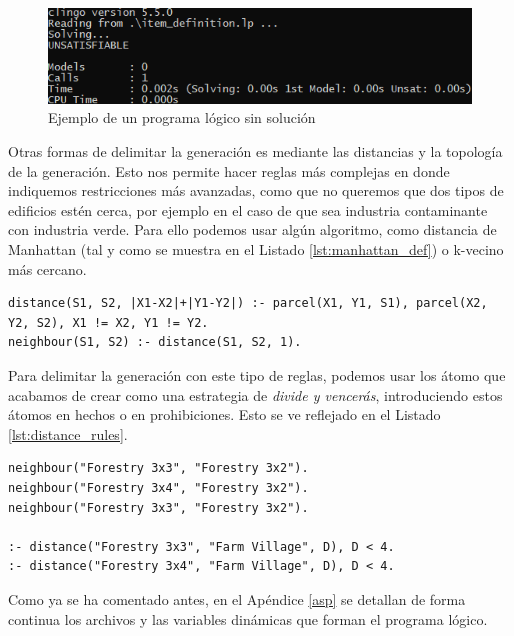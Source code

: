 \begin{figure}[!h]
	\centering
	\includegraphics[width=\textwidth]{images/clingo-unsat}
	\caption{Ejemplo de un programa lógico sin solución}
	\label{fig:clingo-unsat}
\end{figure}

Otras formas de delimitar la generación es mediante las distancias y la topología de la generación. Esto nos permite hacer reglas más complejas en donde indiquemos restricciones más avanzadas, como que no queremos que dos tipos de edificios estén cerca, por ejemplo en el caso de que sea industria contaminante con industria verde. Para ello podemos usar algún algoritmo, como distancia de Manhattan (tal y como se muestra en el Listado \ref{lst:manhattan_def}) o k-vecino más cercano. \\

\begin{lstlisting}[caption={Cálculo de la distancia del taxista en Aswer Set Programing},captionpos=b,label=lst:manhattan_def]
distance(S1, S2, |X1-X2|+|Y1-Y2|) :- parcel(X1, Y1, S1), parcel(X2, Y2, S2), X1 != X2, Y1 != Y2.
neighbour(S1, S2) :- distance(S1, S2, 1).
\end{lstlisting}

Para delimitar la generación con este tipo de reglas, podemos usar los átomo que acabamos de crear como una estrategia de \textit{divide y vencerás}, introduciendo estos átomos en hechos o en prohibiciones. Esto se ve reflejado en el Listado \ref{lst:distance_rules}.

\begin{lstlisting}[caption={Prohibiciones de generación de edificios},captionpos=b,label=lst:distance_rules]
neighbour("Forestry 3x3", "Forestry 3x2").
neighbour("Forestry 3x4", "Forestry 3x2").
neighbour("Forestry 3x3", "Forestry 3x2").

:- distance("Forestry 3x3", "Farm Village", D), D < 4.
:- distance("Forestry 3x4", "Farm Village", D), D < 4.
\end{lstlisting}

Como ya se ha comentado antes, en el Apéndice \ref{asp} se detallan de forma continua los archivos y las variables dinámicas que forman el programa lógico.

